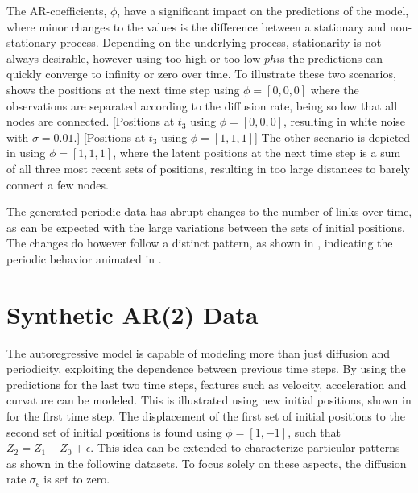         The AR-coefficients, $\phi$, have a significant impact on the predictions of the model, where minor changes to the values is the difference between a stationary and non-stationary process. Depending on the underlying process, stationarity is not always desirable, however using too high or too low $phi$s the predictions can quickly converge to infinity or zero over time. 
        To illustrate these two scenarios,  shows the positions at the next time step using $\phi=[0,0,0]$ where the observations are separated according to the diffusion rate, being so low that all nodes are connected. 
        \xdouble
        {[Positions at $t_3$ using $\phi=[0,0,0]$, resulting in white noise with $\sigma=0.01$.]}
        {[Positions at $t_3$ using $\phi=[1,1,1]$]}
        The other scenario is depicted in  using $\phi=[1,1,1]$, where the latent positions at the next time step is a sum of all three most recent sets of positions, resulting in too large distances to barely connect a few nodes.
        
        The generated periodic data has abrupt changes to the number of links over time, as can be expected with the large variations between the sets of initial positions. The changes do however follow a distinct pattern, as shown in , indicating the periodic behavior animated in .
        
\section{Synthetic AR(2) Data}
    
    The autoregressive model is capable of modeling more than just diffusion and periodicity, exploiting the dependence between previous time steps. By using the predictions for the last two time steps, features such as velocity, acceleration and curvature can be modeled. This is illustrated using new initial positions, shown in  for the first time step. 
    The displacement of the first set of initial positions to the second set of initial positions is found using $\phi=[1,-1]$, such that $Z_2 = Z_1 - Z_0 + \epsilon$. This idea can be extended to characterize particular patterns as shown in the following datasets. To focus solely on these aspects, the diffusion rate $\sigma_\epsilon$ is set to zero.
        
